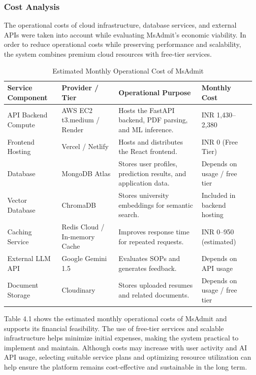 \subsubsection{Cost Analysis}

The operational costs of cloud infrastructure, database services, and external APIs were taken into account while evaluating MsAdmit's economic viability. In order to reduce operational costs while preserving performance and scalability, the system combines premium cloud resources with free-tier services.



\begin{table}[H]
\centering
\caption{Estimated Monthly Operational Cost of MsAdmit}
\label{tab:cost_analysis}
\renewcommand{\arraystretch}{1.3}

\begin{tabularx}{\columnwidth}{|p{2.1cm}|p{2.1cm}|X|p{1.6cm}|}
\hline
\textbf{Service Component} &
\textbf{Provider / Tier} &
\textbf{Operational Purpose} &
\textbf{Monthly Cost} \\
\hline
API Backend Compute &
AWS EC2 t3.medium / Render &
Hosts the FastAPI backend, PDF parsing, and ML inference. &
INR 1,430--2,380 \\
\hline
Frontend Hosting &
Vercel / Netlify &
Hosts and distributes the React frontend. &
INR 0 (Free Tier) \\
\hline
Database &
MongoDB Atlas &
Stores user profiles, prediction results, and application data. &
Depends on usage / free tier \\
\hline
Vector Database &
ChromaDB &
Stores university embeddings for semantic search. &
Included in backend hosting \\
\hline
Caching Service &
Redis Cloud / In-memory Cache &
Improves response time for repeated requests. &
INR 0--950 (estimated) \\
\hline
External LLM API &
Google Gemini 1.5 &
Evaluates SOPs and generates feedback. &
Depends on API usage \\
\hline
Document Storage &
Cloudinary &
Stores uploaded resumes and related documents. &
Depends on usage / free tier \\
\hline
\end{tabularx}
\end{table}

\noindent
 Table 4.1 shows the  estimated monthly
operational costs of MsAdmit and supports its financial feasibility.
The use of free-tier services and scalable infrastructure helps
minimize initial expenses, making the system practical to implement
and maintain. Although costs may increase with user activity and
AI API usage, selecting suitable service plans and optimizing
resource utilization can help ensure the platform remains
cost-effective and sustainable in the long term.



